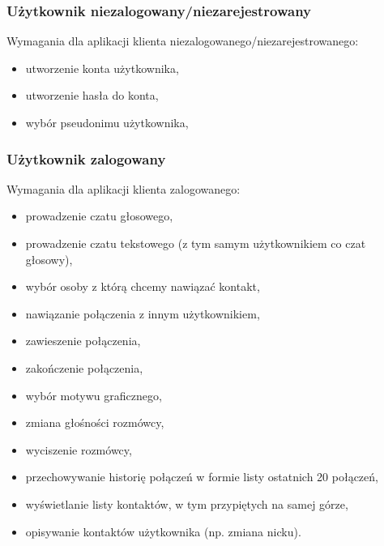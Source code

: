 \documentclass[12pt,a4paper]{article}
\begin{document}
	\subsubsection{Użytkownik niezalogowany/niezarejestrowany}
	\par Wymagania dla aplikacji klienta niezalogowanego/niezarejestrowanego:
	\begin{itemize}
		\item utworzenie konta użytkownika,
		\item utworzenie hasła do konta,
		\item wybór pseudonimu użytkownika,
	\end{itemize}
	\subsubsection{Użytkownik zalogowany}
	\par Wymagania dla aplikacji klienta zalogowanego:
	\begin{itemize}
		\item prowadzenie czatu głosowego,
		\item prowadzenie czatu tekstowego (z tym samym użytkownikiem co czat głosowy),
		\item wybór osoby z którą chcemy nawiązać kontakt,
		\item nawiązanie połączenia z innym użytkownikiem,
		\item zawieszenie połączenia,
		\item zakończenie połączenia,
		\item wybór motywu graficznego,
		\item zmiana głośności rozmówcy,
		\item wyciszenie rozmówcy,
		\item przechowywanie historię połączeń w formie listy ostatnich 20 połączeń,
		\item wyświetlanie listy kontaktów, w tym przypiętych na samej górze,
		\item opisywanie kontaktów użytkownika (np. zmiana nicku).
	\end{itemize}
\end{document}
